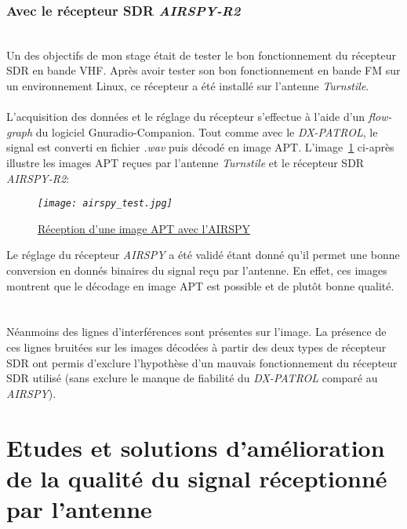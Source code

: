 \documentclass[12pt,fleqn]{book} %
\begin{document}
\subsection{Avec le récepteur SDR \emph{AIRSPY-R2}}
~\\Un des objectifs de mon stage était de tester le bon fonctionnement du récepteur SDR en bande VHF. Après avoir tester son bon fonctionnement en bande FM sur un environnement Linux, ce récepteur a été installé sur l'antenne \emph{Turnstile}.
~\\\\L'acquisition des données et le réglage du récepteur s'effectue à l'aide d'un \emph{flow-graph} du logiciel Gnuradio-Companion. Tout comme avec le \emph{DX-PATROL}, le signal est converti en fichier \emph{.wav} puis décodé en image APT. L'image~\underline{\color{blue}\ref{airspy_test}} ci-après illustre les images APT reçues par l'antenne \emph{Turnstile} et le récepteur SDR \emph{AIRSPY-R2}:
\begin{figure}[H]
	\centering
	\itshape
	\texttt{[image: airspy\_test.jpg]}
	\caption{\label{airspy_test} \underline{Réception d'une image APT avec l'AIRSPY}}
\end{figure}
Le réglage du récepteur \emph{AIRSPY} a été validé étant donné qu'il permet une bonne conversion en donnés binaires du signal reçu par l'antenne. En effet, ces images montrent que le décodage en image APT est possible et de plutôt bonne qualité.
~\\\\Néanmoins des lignes d'interférences sont présentes sur l'image. La présence de ces lignes bruitées sur les images décodées à partir des deux types de récepteur SDR ont permis d'exclure l'hypothèse d'un mauvais fonctionnement du récepteur SDR utilisé (sans exclure le manque de fiabilité du \emph{DX-PATROL} comparé au \emph{AIRSPY}). 
\chapter{Etudes et solutions d'amélioration de la qualité du signal réceptionné par l'antenne}
\end{document}
